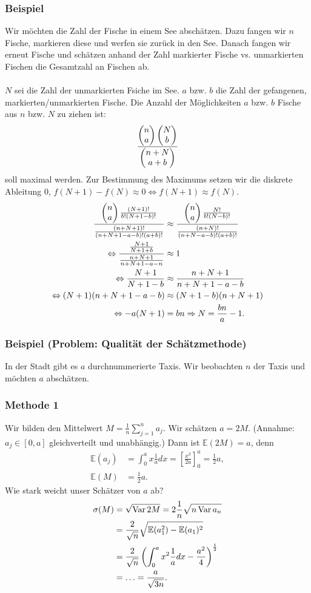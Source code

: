 \subsubsection{Beispiel}
Wir m\"ochten die Zahl der Fische in einem See absch\"atzen. Dazu fangen wir $n$ Fische, markieren diese und werfen sie zur\"uck in den See. Danach fangen wir erneut Fische und sch\"atzen anhand der Zahl markierter Fische vs. unmarkierten Fischen die Gesamtzahl an Fischen ab.
\\~\\
$N$ sei die Zahl der unmarkierten Fsiche im See. $a$ bzw. $b$ die Zahl der gefangenen, markierten/unmarkierten Fische. Die Anzahl der M\"oglichkeiten $a$ bzw. $b$ Fische aus $n$ bzw. $N$ zu ziehen ist:
\[
\frac{\begin{pmatrix}n\\a\end{pmatrix}\begin{pmatrix}N\\b\end{pmatrix}}{\begin{pmatrix}n+N\\a+b\end{pmatrix}}
\]
soll maximal werden. Zur Bestimmung des Maximums setzen wir die diskrete Ableitung $0$, $f(N+1)-f(N)\approx0\Leftrightarrow f(N+1)\approx f(N)$.
\begin{align*}
\frac{\begin{pmatrix}n\\a\end{pmatrix}\frac{(N+1)!}{b!(N+1-b)!}}{\frac{(n+N+1)!}{(n+N+1-a-b)!(a+b)!}}
&\approx
\frac{\begin{pmatrix}n\\a\end{pmatrix}\frac{N!}{b!(N-b)!}}{\frac{(n+N)!}{(n+N-a-b)!(a+b)!}}
\\\Leftrightarrow
\frac{\frac{N+1}{N+1+b}}{\frac{n+N+1}{n+N+1-a-n}}
&\approx
1
\\\Leftrightarrow
\frac{N+1}{N+1-b}
&\approx
\frac{n+N+1}{n+N+1-a-b}
\\\Leftrightarrow
(N+1)(n+N+1-a-b)
&\approx
(N+1-b)(n+N+1)
\\\Leftrightarrow
-a(N+1)
&=
bn
\Rightarrow N=\frac{bn}{a}-1.
\end{align*}
\subsubsection{Beispiel (Problem: Qualit\"at der Sch\"atzmethode)}
In der Stadt gibt es $a$ durchnummerierte Taxis. Wir beobachten $n$ der Taxis und m\"ochten $a$ absch\"atzen.
\subsubsection{Methode 1}
Wir bilden den Mittelwert $M=\frac{1}{n}\sum_{j=1}^na_j$. Wir sch\"atzen $a=2M$. (Annahme: $a_j\in[0,a]$ gleichverteilt und unabh\"angig.) Dann ist $\mathbb{E}(2M)=a$, denn
\begin{align*}
\mathbb{E}(a_j)&=\int_0^ax\frac{1}{a}dx=\left[\frac{x^2}{2a}\right]_0^a=\frac{1}{2}a,\\
\mathbb{E}(M)&=\frac{1}{2}a.
\end{align*}
Wie stark weicht unser Sch\"atzer von $a$ ab?
\begin{align*}
\sigma(M)&=\sqrt{\operatorname{Var} 2M}=2\frac{1}{n}\sqrt{n\operatorname{Var} a_n}\\
&=\frac{2}{\sqrt{n}}\sqrt{\mathbb{E}(a_1^2)-\mathbb{E}(a_1)^2}\\
&=\frac{2}{\sqrt{n}}\left(\int_0^ax^2\frac{1}{a}dx-\frac{a^2}{4}\right)^{\frac{1}{2}}\\
&=\ldots=\frac{a}{\sqrt{3n}}.
\end{align*}
